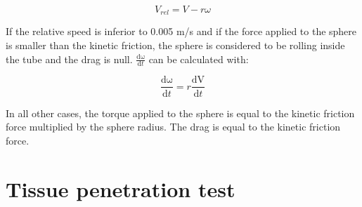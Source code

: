 \documentclass[letterpaper, 10 pt, conference]{ieeeconf}  %
\begin{document}
\begin{equation}
V_{rel}=V-r\omega
\label{relV}
\end{equation}

 
If the relative speed is inferior to 0.005 m/s and if the force applied to the sphere is smaller than the kinetic friction, the sphere is considered to be rolling inside the tube and the drag is null. $\frac{\mathrm{d\omega } }{\mathrm{d} t}$ can be calculated with:

\begin{equation}
\frac{\mathrm{d\omega } }{\mathrm{d} t}=r\frac{\mathrm{dV } }{\mathrm{d} t}
\label{domega}
\end{equation}

In all other cases, the torque applied to the sphere is equal to the kinetic friction force multiplied by the sphere radius. The drag is equal to the kinetic friction force.

\section{Tissue penetration test}


\end{document}
